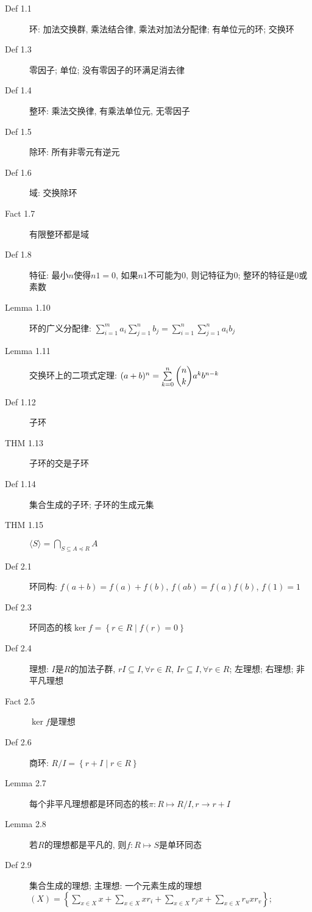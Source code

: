 \documentclass{article}
\renewcommand{\l}{\left}
\renewcommand{\r}{\right}
\begin{document}
    \begin{description}
        \item[Def 1.1] 环: 加法交换群, 乘法结合律, 乘法对加法分配律; 有单位元的环; 交换环
        \item[Def 1.3] 零因子; 单位; 没有零因子的环满足消去律
        \item[Def 1.4] 整环: 乘法交换律, 有乘法单位元, 无零因子
        \item[Def 1.5] 除环: 所有非零元有逆元
        \item[Def 1.6] 域: 交换除环
        \item[Fact 1.7] 有限整环都是域
        \item[Def 1.8] 特征: 最小$n$使得$n1 = 0$, 如果$n1$不可能为$0$, 则记特征为$0$; 整环的特征是$0$或素数
        \item[Lemma 1.10] 环的广义分配律: $\sum\limits_{i = 1}^m a_i \sum\limits_{j = 1}^n b_j = \sum\limits_{i = 1}^n \sum\limits_{j = 1}^n a_ib_j$
        \item[Lemma 1.11] 交换环上的二项式定理: $(a + b)^n = \sum\limits_{k = 0}^n \dbinom{n}{k} a^k b^{n - k}$
        \item[Def 1.12] 子环
        \item[THM 1.13] 子环的交是子环
        \item[Def 1.14] 集合生成的子环; 子环的生成元集
        \item[THM 1.15] $\langle S \rangle = \bigcap\limits_{S \subseteq A \preceq R} A$
        \item[Def 2.1] 环同构: $f(a + b) = f(a) + f(b)$, $f(ab) = f(a)f(b)$, $f(1) = 1$
        \item[Def 2.3] 环同态的核$\ker f = \l\{ r \in R \mid f(r) = 0 \r\}$
        \item[Def 2.4] 理想: $I$是$R$的加法子群, $rI \subseteq I, \forall r \in R$, $Ir \subseteq I, \forall r \in R$; 左理想; 右理想; 非平凡理想
        \item[Fact 2.5] $\ker f$是理想
        \item[Def 2.6] 商环: $R/I = \l\{r + I \mid r \in R \r\}$
        \item[Lemma 2.7] 每个非平凡理想都是环同态的核\hfill$\pi : R \mapsto R/I, r \to r + I$
        \item[Lemma 2.8] 若$R$的理想都是平凡的, 则$f : R\mapsto S$是单环同态
        \item[Def 2.9] 集合生成的理想; 主理想: 一个元素生成的理想\\
            $(X) = \l\{ \sum\limits_{x \in X} x + \sum\limits_{x \in X} xr_i + \sum\limits_{x \in X} r_jx + \sum\limits_{x \in X} r_uxr_v \r\}$;

\end{description}
\end{document}
